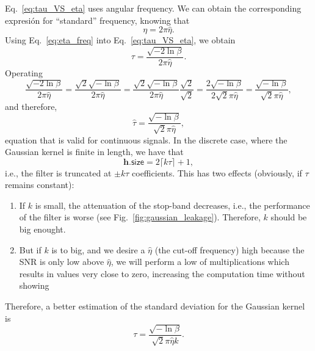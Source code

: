\documentclass{article}
\begin{document}
Eq.~\ref{eq:tau_VS_eta} uses angular frequency. We can obtain the
corresponding expresión for ``standard'' frequency, knowing that
\begin{equation}
  \eta = 2\pi\hat{\eta}.
  \label{eq:eta_freq}
\end{equation}
Using Eq.~\ref{eq:eta_freq} into Eq.~\ref{eq:tau_VS_eta}, we obtain
\begin{equation}
  \tau = \frac{\sqrt{-2\ln\beta}}{2\pi\hat{\eta}}.
  \label{eq:tau_VS_eta_standard}
\end{equation}
Operating
\begin{equation*}
  \frac{\sqrt{-2\ln\beta}}{2\pi\hat{\eta}} = \frac{\sqrt{2}\sqrt{-\ln\beta}}{2\pi\hat{\eta}} = \frac{\sqrt{2}\sqrt{-\ln\beta}}{2\pi\hat{\eta}}\frac{\sqrt{2}}{\sqrt{2}} = \frac{2\sqrt{-\ln\beta}}{2\sqrt{2}\pi\hat{\eta}} = \frac{\sqrt{-\ln\beta}}{\sqrt{2}\pi\hat{\eta}},
\end{equation*}
and therefore,
\begin{equation}
  \hat{\tau} = \frac{\sqrt{-\ln\beta}}{\sqrt{2}\pi\hat{\eta}},
  \label{eq:ideal_hat_tau}
\end{equation}
equation that is valid for continuous signals. In the discrete case,
where the Gaussian kernel is finite in length, we have that
\begin{equation}
  \mathbf{h}.\mathsf{size} = 2\lceil k\tau\rceil + 1,
  \label{eq:kernel_length}
\end{equation}
i.e., the filter is truncated at $\pm k\tau$ coefficients. This has
two effects (obviously, if $\tau$ remains constant):
\begin{enumerate}
\item If $k$ is small, the attenuation of the stop-band decreases,
  i.e., the performance of the filter is worse (see
  Fig.~\ref{fig:gaussian_leakage}). Therefore, $k$ should be big
  enought.
\item But if $k$ is to big, and we desire a $\hat{\eta}$ (the cut-off
  frequency) high because the SNR is only low above $\hat{\eta}$, we
  will perform a low of multiplications which results in values very
  close to zero, increasing the computation time without showing
\end{enumerate}
Therefore, a better estimation of the standard deviation for the
Gaussian kernel is
\begin{equation}
  \tau = \frac{\sqrt{-\ln\beta}}{\sqrt{2}\pi\hat{\eta}k}.
  \label{eq:ideal_hat_tau}
\end{equation}
\end{document}
